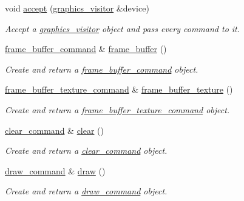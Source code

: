 \begin{DoxyCompactItemize}
void \mbox{\hyperlink{classmoka_1_1command__buffer_a9765709e0b8ba774d9f01bee0f99da29}{accept}} (\mbox{\hyperlink{classmoka_1_1graphics__visitor}{graphics\+\_\+visitor}} \&device)
\begin{DoxyCompactList}\small\item\em Accept a \mbox{\hyperlink{classmoka_1_1graphics__visitor}{graphics\+\_\+visitor}} object and pass every command to it. \end{DoxyCompactList}\item 
\mbox{\hyperlink{classmoka_1_1frame__buffer__command}{frame\+\_\+buffer\+\_\+command}} \& \mbox{\hyperlink{classmoka_1_1command__buffer_a1424c63f7c6ed14cc9c7fe2b1a2b6400}{frame\+\_\+buffer}} ()
\begin{DoxyCompactList}\small\item\em Create and return a \mbox{\hyperlink{classmoka_1_1frame__buffer__command}{frame\+\_\+buffer\+\_\+command}} object. \end{DoxyCompactList}\item 
\mbox{\hyperlink{classmoka_1_1frame__buffer__texture__command}{frame\+\_\+buffer\+\_\+texture\+\_\+command}} \& \mbox{\hyperlink{classmoka_1_1command__buffer_ac440268877f7ed2297d2b7de4dac0e7a}{frame\+\_\+buffer\+\_\+texture}} ()
\begin{DoxyCompactList}\small\item\em Create and return a \mbox{\hyperlink{classmoka_1_1frame__buffer__texture__command}{frame\+\_\+buffer\+\_\+texture\+\_\+command}} object. \end{DoxyCompactList}\item 
\mbox{\hyperlink{classmoka_1_1clear__command}{clear\+\_\+command}} \& \mbox{\hyperlink{classmoka_1_1command__buffer_ad205979eec979fef0635c8f34ac53251}{clear}} ()
\begin{DoxyCompactList}\small\item\em Create and return a \mbox{\hyperlink{classmoka_1_1clear__command}{clear\+\_\+command}} object. \end{DoxyCompactList}\item 
\mbox{\hyperlink{classmoka_1_1draw__command}{draw\+\_\+command}} \& \mbox{\hyperlink{classmoka_1_1command__buffer_a7015f06818636a80e846c0ce3bf4eea2}{draw}} ()
\begin{DoxyCompactList}\small\item\em Create and return a \mbox{\hyperlink{classmoka_1_1draw__command}{draw\+\_\+command}} object. \end{DoxyCompactList}\item 

\end{DoxyCompactItemize}
